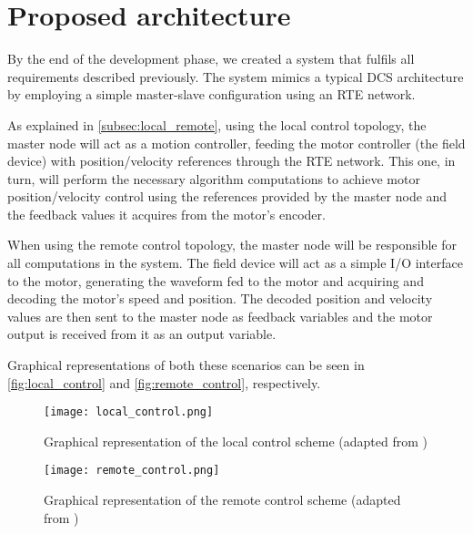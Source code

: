 \section{Proposed architecture} \label{sec:proposed-arch}

By the end of the development phase, we created a system that fulfils all requirements described previously.
The system mimics a typical DCS architecture by employing a simple master-slave configuration using an RTE network.

As explained in \autoref{subsec:local_remote}, using the local control topology, the master node will act as a motion controller, feeding the motor controller (the field device) with position/velocity references through the RTE network.
This one, in turn, will perform the necessary algorithm computations to achieve motor position/velocity control using the references provided by the master node and the feedback values it acquires from the motor's encoder.

When using the remote control topology, the master node will be responsible for all computations in the system.
The field device will act as a simple I/O interface to the motor, generating the waveform fed to the motor and acquiring and decoding the motor's speed and position.
The decoded position and velocity values are then sent to the master node as feedback variables and the motor output is received from it as an output variable.

Graphical representations of both these scenarios can be seen in \autoref{fig:local_control} and \autoref{fig:remote_control}, respectively. 

\begin{figure}[htp]
	\centering
	\texttt{[image: local\_control.png]}
	\caption{Graphical representation of the local control scheme (adapted from \cite{rte:motion-control-over-rte})}
	\label{fig:local_control}
\end{figure}

\begin{figure}[htp]
	\centering
	\texttt{[image: remote\_control.png]}
	\caption{Graphical representation of the remote control scheme (adapted from \cite{rte:motion-control-over-rte})}
	\label{fig:remote_control}
\end{figure}





